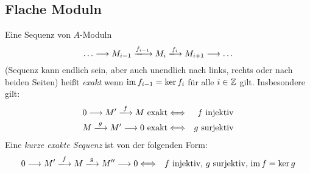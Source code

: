 \documentclass[12pt,a4paper]{scrartcl}
\theoremstyle{cplain}
\theoremstyle{cdef}
\begin{document}
\subsection{Flache Moduln}
\begin{defi}
	Eine Sequenz von $A$-Moduln \[ \ldots \longrightarrow M_{i-1} \xlongrightarrow{f_{i-1}} M_i \xlongrightarrow{f_{i}} M_{i+1} \longrightarrow \ldots \] (Sequenz kann endlich sein, aber auch unendlich nach links, rechts oder nach beiden Seiten) heißt \emph{exakt} wenn $\operatorname{im} f_{i-1} = \operatorname{ker} f_i$ für alle $i \in \mathbb Z$ gilt. Insbesondere gilt:
	\begin{eqnarray*}
		0 \longrightarrow M' \xlongrightarrow{f} M \text{ exakt} &\Longleftrightarrow& \text{$f$ injektiv} \\
		M \xlongrightarrow{g} M' \longrightarrow 0 \text{ exakt} &\Longleftrightarrow& \text{$g$ surjektiv}
	\end{eqnarray*}
	Eine \emph{kurze exakte Sequenz} ist von der folgenden Form:
	\begin{eqnarray*}
		0 \longrightarrow M' \xlongrightarrow{f} M \xlongrightarrow{g} M'' \longrightarrow 0 &\Longleftrightarrow& \text{$f$ injektiv, $g$ surjektiv, $\im f = \ker g$}
	\end{eqnarray*}
\end{defi}
\end{document}
